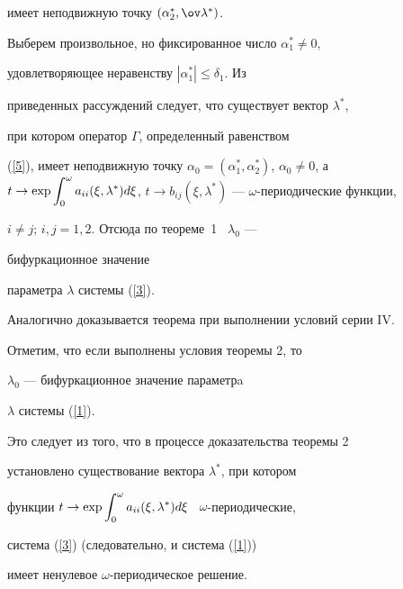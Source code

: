 \begin{pf}
имеет неподвижную точку $(\alpha_2^*,\ov \lambda ^*)$.


Выберем произвольное, но фиксированное число $\alpha_1^* \ne 0$,


удовлетворяющее неравенству $|\alpha_1^* | \le \delta_1$. Из


приведенных рассуждений следует, что существует вектор $\lambda^*$,


при котором оператор $\Gamma$, определенный равенством


(\ref{5}), имеет неподвижную точку $\alpha_0=


(\alpha_1^*,\alpha_2^*)$, $\alpha_0 \ne 0$, а $t \to \exp


\ds\int_0^\omega a_{ii} (\xi,\lambda ^*)d\xi$, $t \to


b_{ij} (\xi,\lambda ^*)$ --- $\omega$-периодические функции,


$i \ne j$; $i,j=1,2$. Отсюда по теореме~1 \ $\lambda_0$ ---


бифуркационное значение


параметра $\lambda$ системы (\ref{3}).





Аналогично доказывается теорема при выполнении условий серии IV.


\end{pf}





Отметим, что если выполнены условия теоремы 2, то


$\lambda_0$ --- бифуркационное значение параметрa


$\lambda$ системы (\ref{1}).


Это следует из того, что в процессе доказательства теоремы 2


установлено существование вектора $\lambda ^*$, при котором


функции $t\to\exp\ds\int_0^\omega a_{ii}


(\xi,\lambda ^*)d\xi$ \ $\omega$-периодические,


система (\ref{3}) (следовательно, и система (\ref{1}))


имеет ненулевое $\omega$-периодическое решение.





